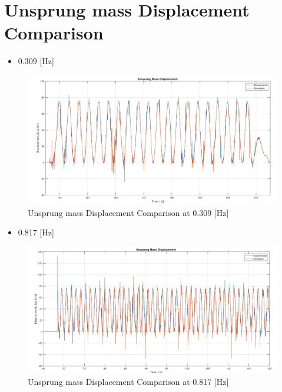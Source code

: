 \section{Unsprung mass Displacement Comparison}
\begin{itemize}
	\item 0.309 [Hz]
\end{itemize}
\begin{figure}[H]
	\centering
	\includegraphics[width=0.9\linewidth]{figures/0.309 Us.png}
	\caption{Unsprung mass Displacement Comparison at 0.309 [Hz]}
	\label{fig:Unsprung mass Displacement Comparison at 0.309}
\end{figure}

\begin{itemize}
	\item 0.817 [Hz]
\end{itemize}
\begin{figure}[H]
	\centering
	\includegraphics[width=0.99\linewidth]{figures/0.817 Us.png}
	\caption{Unsprung mass Displacement Comparison at 0.817 [Hz]}
	\label{fig:Unsprung mass Displacement Comparison at 0.817}
\end{figure}


